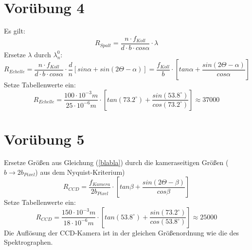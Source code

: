 \documentclass[titlepage]{scrartcl}
\begin{document}
\section{Vorübung 4}
Es gilt:
\begin{equation}
R_{Spalt} = \frac{n\cdot f_{Koll}}{d\cdot b\cdot cos \alpha}\cdot \lambda
\end{equation}
Ersetze $\lambda$ durch $\lambda_n^0$:
\begin{equation}
R_{Echelle} = \frac{n\cdot f_{Koll}}{d\cdot b\cdot cos \alpha}\cdot \frac{d}{n}[sin \alpha + sin(2\Theta-\alpha)] = \frac{f_{Koll}}{b}\cdot [tan \alpha + \frac{sin(2\Theta-\alpha)}{cos \alpha}]
\label{blabla}
\end{equation}
Setze Tabellenwerte ein:
\begin{equation}
R_{Echelle} = \frac{100 \cdot 10^{-3}m}{25 \cdot 10^{-6}m}\cdot [tan (73.2^{\circ}) + \frac{sin(53.8^{\circ})}{cos (73.2^{\circ})}] \approx 37000
\end{equation}
\section{Vorübung 5}
Ersetze Größen aus Gleichung (\ref{blabla}) durch die kameraseitigen Größen ($b \rightarrow 2b_{Pixel}$) aus dem Nyquist-Kriterium)
\begin{equation}
R_{CCD} = \frac{f_{Kamera}}{2b_{Pixel}}\cdot [tan \beta + \frac{sin(2\Theta-\beta)}{cos \beta}]
\end{equation}
Setze Tabellenwerte ein:
\begin{equation}
R_{CCD} = \frac{150\cdot10^{-3}m}{18\cdot10^{-6}m}\cdot [tan (53.8^{\circ}) + \frac{sin(73.2^{\circ})}{cos (53.8^{\circ})}] \approx 25000
\end{equation}
Die Auflösung der CCD-Kamera ist in der gleichen Größenordnung wie die des Spektrographen. 
\end{document}
